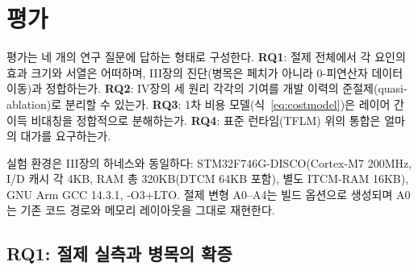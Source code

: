 \section{평가}\label{sec:eval}

평가는 네 개의 연구 질문에 답하는 형태로 구성한다.
\textbf{RQ1}: 절제 전체에서 각 요인의 효과 크기와 서열은 어떠하며,
III장의 진단(병목은 페치가 아니라 0-피연산자 데이터 이동)과
정합하는가.
\textbf{RQ2}: IV장의 세 원리 각각의 기여를 개발 이력의
준절제(quasi-ablation)로 분리할 수 있는가.
\textbf{RQ3}: 1차 비용 모델(식~\ref{eq:costmodel})은 레이어 간
이득 비대칭을 정합적으로 분해하는가.
\textbf{RQ4}: 표준 런타임(TFLM) 위의 통합은 얼마의 대가를 요구하는가.

실험 환경은 III장의 하네스와 동일하다: STM32F746G-DISCO(Cortex-M7
200MHz, I/D 캐시 각 4KB, RAM 총 320KB(DTCM 64KB 포함), 별도
ITCM-RAM 16KB)\cite{st_rm0385}, GNU Arm GCC 14.3.1, -O3+LTO. 절제
변형 A0--A4는 빌드 옵션으로 생성되며 A0는 기존 코드 경로와 메모리
레이아웃을 그대로 재현한다.

\subsection{RQ1: 절제 실측과 병목의 확증}

